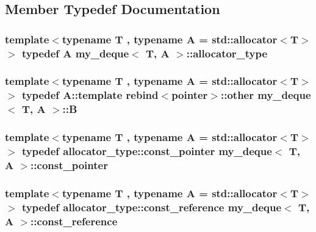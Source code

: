 \subsection{Member Typedef Documentation}
\hypertarget{classmy__deque_a34236f0fef930decd11dc683f40a38be}{
\subsubsection[{allocator\-\_\-type}]{\setlength{\rightskip}{0pt plus 5cm}template$<$typename T , typename A  = std\-::allocator$<$\-T$>$$>$ typedef A {\bf my\-\_\-deque}$<$ T, A $>$\-::{\bf allocator\-\_\-type}}}\label{classmy__deque_a34236f0fef930decd11dc683f40a38be}
\hypertarget{classmy__deque_a1a55c016646bba79086d90d3cccde143}{
\subsubsection[{B}]{\setlength{\rightskip}{0pt plus 5cm}template$<$typename T , typename A  = std\-::allocator$<$\-T$>$$>$ typedef A\-::template rebind$<${\bf pointer}$>$\-::other {\bf my\-\_\-deque}$<$ T, A $>$\-::{\bf B}}}\label{classmy__deque_a1a55c016646bba79086d90d3cccde143}
\hypertarget{classmy__deque_a8fea5edeb2b2cf3dd1246dc3abf9b71b}{
\subsubsection[{const\-\_\-pointer}]{\setlength{\rightskip}{0pt plus 5cm}template$<$typename T , typename A  = std\-::allocator$<$\-T$>$$>$ typedef allocator\-\_\-type\-::const\-\_\-pointer {\bf my\-\_\-deque}$<$ T, A $>$\-::{\bf const\-\_\-pointer}}}\label{classmy__deque_a8fea5edeb2b2cf3dd1246dc3abf9b71b}
\hypertarget{classmy__deque_ad50d8b378580088cf77fa43f0640e49c}{
\subsubsection[{const\-\_\-reference}]{\setlength{\rightskip}{0pt plus 5cm}template$<$typename T , typename A  = std\-::allocator$<$\-T$>$$>$ typedef allocator\-\_\-type\-::const\-\_\-reference {\bf my\-\_\-deque}$<$ T, A $>$\-::{\bf const\-\_\-reference}}}\label{classmy__deque_ad50d8b378580088cf77fa43f0640e49c}
